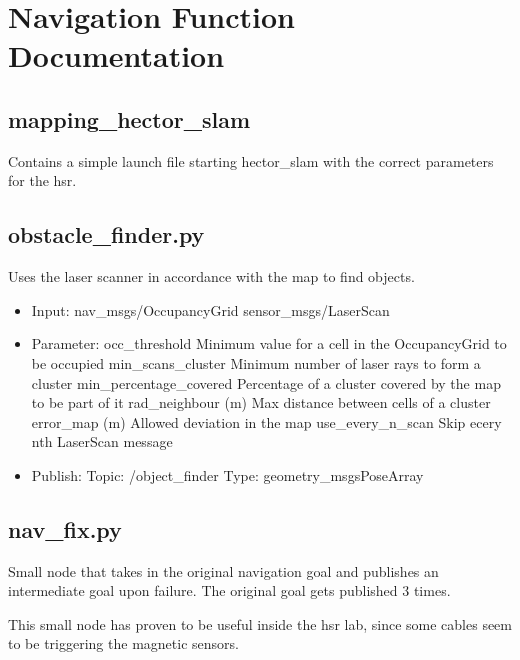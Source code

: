\documentclass[main.tex]{subfiles}
\begin{document}
	\begingroup

	\renewcommand{\cleardoublepage}{}

	\renewcommand{\clearpage}{}

	\chapter{Navigation Function Documentation}

		
		\section{mapping\_hector\_slam}
		Contains a simple launch file starting hector\_slam with the correct parameters for the hsr.
		
		\section{obstacle\_finder.py}
		Uses the laser scanner in accordance with the map to find objects.
		
		\begin{itemize}
			\item Input: 
				\subitem nav\_msgs/OccupancyGrid
				\subitem sensor\_msgs/LaserScan
			\item Parameter:
				\subitem occ\_threshold 
				Minimum value for a cell in the OccupancyGrid to be occupied
				\subitem min\_scans\_cluster
				Minimum number of laser rays to form a cluster
				\subitem min\_percentage\_covered
				Percentage of a cluster covered by the map to be part of it
				\subitem rad\_neighbour (m)
				Max distance between cells of a cluster
				\subitem error\_map (m)
				Allowed deviation in the map
				\subitem use\_every\_n\_scan
				Skip ecery nth LaserScan message 
			\item  Publish:
				\subitem Topic: /object\_finder
				\subitem Type: geometry\_msgsPoseArray
		\end{itemize}
		
		\section{nav\_fix.py}
		Small node that takes in the original navigation goal and publishes an intermediate goal upon failure. The original goal gets published 3 times.
		
		This small node has proven to be useful inside the hsr lab, since some cables seem to be triggering the magnetic sensors.

	\endgroup
\end{document}
